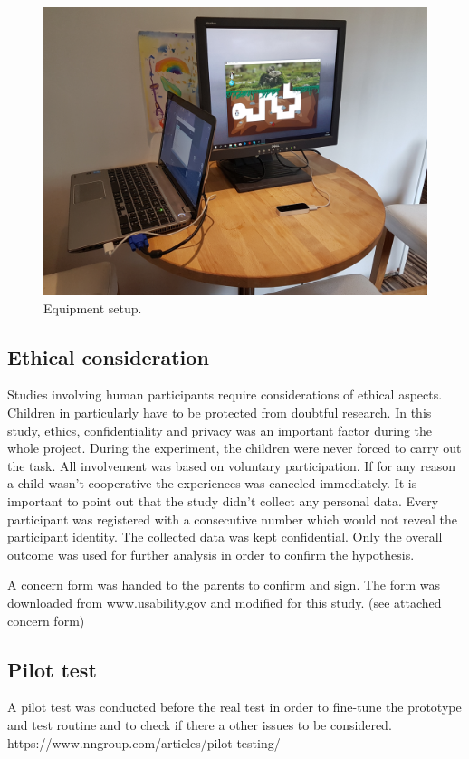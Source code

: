 \begin{figure}[h]  %
  \centering
  \includegraphics[width=.5\textwidth]{figures/setup.jpg}
  \caption[Equipment setup.]{Equipment setup.}
  \label{fig:setup}
\end{figure}


\subsection{Ethical consideration}
\label{sec:ethical}

Studies involving human participants require considerations of ethical aspects. Children in particularly have to be protected from doubtful research. In this study, ethics, confidentiality and privacy was an important factor during the whole project.
During the experiment, the children were never forced to carry out the task. All involvement was based on voluntary participation. If for any reason a child wasn't cooperative the experiences was canceled immediately. 
It is important to point out that the study didn't collect any personal data. Every participant was registered with a consecutive number which would not reveal the participant identity. The collected data was kept confidential. Only the overall outcome was used for further analysis in order to confirm the hypothesis.  

A concern form was handed to the parents to confirm and sign. The form was downloaded from www.usability.gov and modified for this study. (see attached concern form)


\subsection{Pilot test}

A pilot test was conducted before the real test in order to fine-tune the prototype and test routine and to check if there a other issues to be considered. 
https://www.nngroup.com/articles/pilot-testing/


